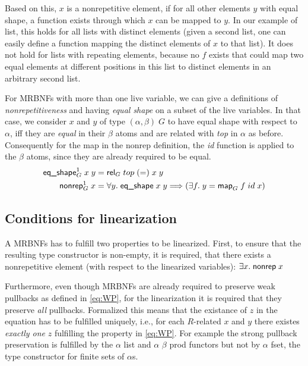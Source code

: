     Based on this, $x$ is a nonrepetitive element, if for all other elements $y$ with equal shape, a function exists through which $x$ can be mapped to $y$. In our example of \textsf{list}, this holds for all lists with distinct elements (given a second list, one can easily define a function mapping the distinct elements of $x$ to that list). It does not hold for lists with repeating elements, because no $f$ exists that could map two equal elements at different positions in this list to distinct elements in an arbitrary second list.

    For \acp{MRBNF} with more than one live variable, we can give a definitions of \textit{nonrepetitiveness} and having \textit{equal shape} on a subset of the live variables. In that case, we consider $x$ and $y$ of type $(\alpha, \beta)\; G$ to have equal shape with respect to $\alpha$, iff they are \textit{equal} in their $\beta$ atoms and are related with \textit{top} in $\alpha$ as before. Consequently for the map in the \textsf{nonrep} definition, the \textit{id} function is applied to the $\beta$ atoms, since they are already required to be equal. 
    \begin{align}
      \text{\textsf{eq\_shape}}_G^1\; x\; y &= \text{\textsf{rel}}_G\; top\; (=)\; x\; y\\
      \text{\textsf{nonrep}}_G^1\; x &= \forall y.\; \text{\textsf{eq\_shape}}\; x\; y \Longrightarrow (\exists f.\; y = \text{\textsf{map}}_G\; f\; id\; x)
    \end{align}
    
    
  \subsection{Conditions for linearization}
  \label{subsec:conditions}
    A \acp{MRBNF} has to fulfill two properties to be linearized. First, to ensure that the resulting type constructor is non-empty, it is required, that there exists a nonrepetitive element (with respect to the linearized variables): $\exists x.\; \text{\textsf{nonrep}}\; x$

    Furthermore, even though \acp{MRBNF} are already required to preserve weak pullbacks as defined in \autoref{eq:WP}, for the linearization it is required that they preserve \textit{all} pullbacks. Formalized this means that the existance of $z$ in the equation has to be fulfilled uniquely, i.e., for each $R$-related $x$ and $y$ there existes \textit{exactly one} $z$ fulfilling the property in \autoref{eq:WP}. For example the strong pullback preservation is fulfilled by the \textsf{$\alpha$ list} and \textsf{$\alpha$ $\beta$ prod} functors but not by \textsf{$\alpha$ fset}, the type constructor for finite sets of $\alpha$s. 


